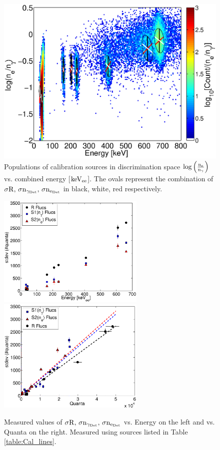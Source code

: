  \begin{figure}[h!]\centering
\includegraphics[width=120mm]{Recombination_LY_QY/Figures/All_disc.eps}
\caption{Populations of calibration sources in discrimination space $\rm log\left(\frac{n_e}{n_\gamma}\right) $ vs. combined energy [$\rm keV_{ee}$]. The ovals represent the combination of $\rm \sigma R, \, \sigma n_{\gamma_{Det}}, \,\sigma n_{e_{Det}} $ in black, white, red respectively.}
\label{fig:E_dis}
\end{figure}

 \begin{figure}[h!]\centering
\includegraphics[width=70mm]{Recombination_LY_QY/Figures/fluc_E.eps}
\includegraphics[width=70mm]{Recombination_LY_QY/Figures/fluc_Q.eps}
\caption{Measured values of $\rm \sigma R, \, \sigma n_{\gamma_{Det}}, \,\sigma n_{e_{Det}} $ vs. Energy on the left and vs. Quanta on the right. Measured using sources listed in Table \ref{table:Cal_lines}. }
\label{fig:Flucs}
\end{figure}


